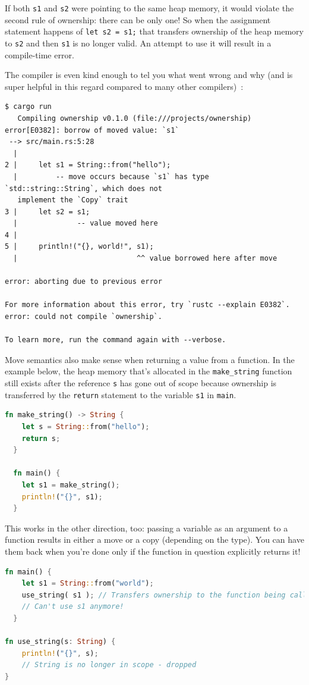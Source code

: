 If both \texttt{s1} and \texttt{s2} were pointing to the same heap memory, it would violate the second rule of ownership: there can be only one! So when the assignment statement happens of \texttt{let s2 = s1;} that transfers ownership of the heap memory to \texttt{s2} and then \texttt{s1} is no longer valid. An attempt to use it will result in a compile-time error. 


The compiler is even kind enough to tel you what went wrong and why (and is super helpful in this regard compared to many other compilers)~\cite{rustdocs}:
\begin{verbatim}
$ cargo run
   Compiling ownership v0.1.0 (file:///projects/ownership)
error[E0382]: borrow of moved value: `s1`
 --> src/main.rs:5:28
  |
2 |     let s1 = String::from("hello");
  |         -- move occurs because `s1` has type `std::string::String`, which does not
   implement the `Copy` trait
3 |     let s2 = s1;
  |              -- value moved here
4 | 
5 |     println!("{}, world!", s1);
  |                            ^^ value borrowed here after move

error: aborting due to previous error

For more information about this error, try `rustc --explain E0382`.
error: could not compile `ownership`.

To learn more, run the command again with --verbose.
\end{verbatim}

Move semantics also make sense when returning a value from a function. In the example below, the heap memory that's allocated in the \texttt{make\_string} function still exists after the reference \texttt{s} has gone out of scope because ownership is transferred by the \texttt{return} statement to the variable \texttt{s1} in \texttt{main}.

\begin{lstlisting}[language=Rust]
  fn make_string() -> String {
    let s = String::from("hello");
    return s;
  }

  fn main() {
    let s1 = make_string();
    println!("{}", s1);
  }
\end{lstlisting}

This works in the other direction, too: passing a variable as an argument to a function results in either a move or a copy (depending on the type). You can have them back when you're done only if the function in question explicitly returns it! 

\begin{lstlisting}[language=Rust]
  fn main() {
    let s1 = String::from("world");
	use_string( s1 ); // Transfers ownership to the function being called
	// Can't use s1 anymore!
  }
  
fn use_string(s: String) {
    println!("{}", s); 
    // String is no longer in scope - dropped
}
\end{lstlisting}

